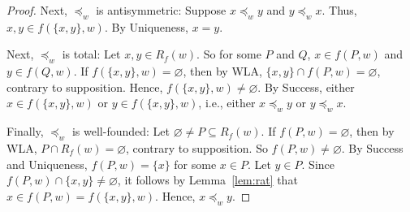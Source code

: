 \documentclass[12pt]{article}
\newcommand{\nec}{\mathop{\Box}}
\newcommand{\pos}{\mathop{\Diamond}}
\begin{document}
\begin{proof}
    Next, $\preceq_w$ is antisymmetric: 
    Suppose $x \preceq_w y$ and $y \preceq_w x$. 
    Thus, $x,y \in f(\{x,y\},w)$. 
    By Uniqueness, $x=y$. 
    
    Next, $\preceq_w$ is total: 
    Let $x,y \in R_f(w)$. 
    So for some $P$ and $Q$, $x \in f(P,w)$ and $y \in f(Q,w)$. 
    If $f(\{x,y\},w) = \varnothing$, then by WLA, $\{x,y\} \cap f(P,w) = \varnothing$, contrary to supposition. 
    Hence, $f(\{x,y\},w) \neq \varnothing$. 
    By Success, either $x \in f(\{x,y\},w)$ or $y \in f(\{x,y\},w)$, i.e., either $x \preceq_w y$ or $y \preceq_w x$. 

    Finally, $\preceq_w$ is well-founded: 
    Let $\varnothing \neq P \subseteq R_f(w)$. 
    If $f(P,w) = \varnothing$, then by WLA, $P \cap R_f(w) = \varnothing$, contrary to supposition. 
    So $f(P,w) \neq \varnothing$. 
    By Success and Uniqueness, $f(P,w) = \{x\}$ for some $x \in P$. 
    Let $y \in P$. 
    Since $f(P,w) \cap \{x,y\} \neq \varnothing$, it follows by Lemma~\ref{lem:rat} that $x \in f(P,w) = f(\{x,y\},w)$. 
    Hence, $x \preceq_w y$. 
\end{proof}

\end{document}
